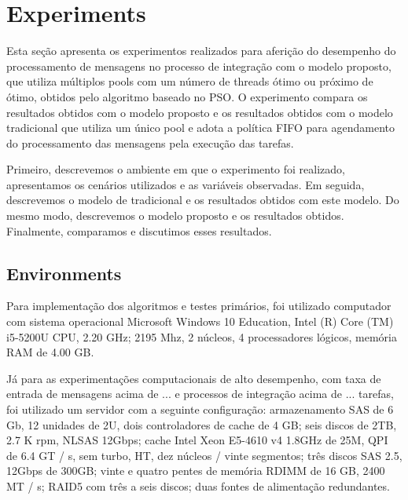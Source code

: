 \section{Experiments}
\label{sec:experiments}
Esta seção apresenta os experimentos realizados para aferição do desempenho do processamento de mensagens no processo de integração com o modelo proposto, que utiliza múltiplos pools com um número de threads ótimo ou próximo de ótimo, obtidos pelo algoritmo baseado no PSO. O experimento compara os resultados obtidos com o modelo proposto e os resultados obtidos com o modelo tradicional que utiliza um único pool e adota a política FIFO para agendamento do processamento das mensagens pela execução das tarefas. 

Primeiro, descrevemos o ambiente em que o experimento foi realizado, apresentamos os cenários utilizados e as variáveis observadas. Em seguida, descrevemos o modelo de tradicional e os resultados obtidos com este modelo. Do mesmo modo, descrevemos o modelo proposto e os resultados obtidos. Finalmente, comparamos e discutimos esses resultados.
\subsection{Environments}
\label{subsec:enviroments}
Para implementação dos algoritmos e testes primários, foi utilizado computador com sistema operacional Microsoft Windows 10 Education, Intel (R) Core (TM) i5-5200U CPU, 2.20 GHz; 2195 Mhz, 2 núcleos, 4 processadores lógicos, memória RAM de 4.00 GB.

Já para as experimentações computacionais de alto desempenho, com taxa de entrada de mensagens acima de ... e processos de integração acima de ... tarefas, foi utilizado um servidor com a seguinte configuração: armazenamento SAS de 6 Gb, 12 unidades de 2U, dois controladores de cache de 4 GB; seis discos de 2TB, 2.7 K rpm, NLSAS 12Gbps; cache Intel Xeon E5-4610 v4 1.8GHz de 25M, QPI de 6.4 GT / s, sem turbo, HT, dez núcleos / vinte segmentos; três discos SAS 2.5, 12Gbps de 300GB; vinte e quatro pentes de memória RDIMM de 16 GB, 2400 MT / s; RAID5 com três a seis discos; duas fontes de alimentação redundantes.

